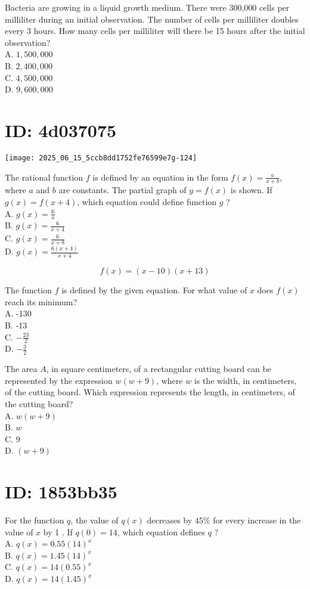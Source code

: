 Bacteria are growing in a liquid growth medium. There were 300,000 cells per milliliter during an initial observation. The number of cells per milliliter doubles every 3 hours. How many cells per milliliter will there be 15 hours after the initial observation?\\
A. $1,500,000$\\
B. $2,400,000$\\
C. $4,500,000$\\
D. $9,600,000$

\section*{ID: 4d037075}
\begin{center}
\texttt{[image: 2025\_06\_15\_5ccb8dd1752fe76599e7g-124]}
\end{center}

The rational function $f$ is defined by an equation in the form $f(x)=\frac{a}{x+b}$, where $a$ and $b$ are constants. The partial graph of $y=f(x)$ is shown. If $g(x)=f(x+4)$, which equation could define function $g$ ?\\
A. $g(x)=\frac{6}{x}$\\
B. $g(x)=\frac{6}{x+4}$\\
C. $g(x)=\frac{6}{x+8}$\\
D. $g(x)=\frac{6(x+4)}{x+4}$

$$
f(x)=(x-10)(x+13)
$$

The function $f$ is defined by the given equation. For what value of $x$ does $f(x)$ reach its minimum?\\
A. -130\\
B. -13\\
C. $-\frac{23}{2}$\\
D. $-\frac{3}{2}$

The area $A$, in square centimeters, of a rectangular cutting board can be represented by the expression $w(w+9)$, where $w$ is the width, in centimeters, of the cutting board. Which expression represents the length, in centimeters, of the cutting board?\\
A. $w(w+9)$\\
B. $w$\\
C. 9\\
D. $(w+9)$

\section*{ID: 1853bb35}
For the function $q$, the value of $q(x)$ decreases by $45 \%$ for every increase in the value of $x$ by 1 . If $q(0)=14$, which equation defines $q$ ?\\
A. $q(x)=0.55(14)^{x}$\\
B. $q(x)=1.45(14)^{x}$\\
C. $q(x)=14(0.55)^{x}$\\
D. $q(x)=14(1.45)^{x}$

